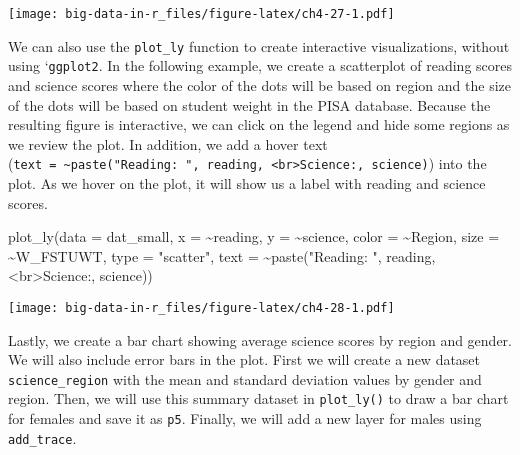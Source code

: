 \documentclass[
]{book}
\newenvironment{Shaded}{\begin{snugshade}}{\end{snugshade}}
\newcommand{\AttributeTok}[1]{\textcolor[rgb]{0.77,0.63,0.00}{#1}}
\newcommand{\FunctionTok}[1]{\textcolor[rgb]{0.00,0.00,0.00}{#1}}
\newcommand{\NormalTok}[1]{#1}
\newcommand{\SpecialCharTok}[1]{\textcolor[rgb]{0.00,0.00,0.00}{#1}}
\newcommand{\StringTok}[1]{\textcolor[rgb]{0.31,0.60,0.02}{#1}}
\begin{document}
\texttt{[image: big-data-in-r\_files/figure-latex/ch4-27-1.pdf]}

We can also use the \texttt{plot\_ly} function to create interactive visualizations, without using `\texttt{ggplot2}. In the following example, we create a scatterplot of reading scores and science scores where the color of the dots will be based on region and the size of the dots will be based on student weight in the PISA database. Because the resulting figure is interactive, we can click on the legend and hide some regions as we review the plot. In addition, we add a hover text (\texttt{text\ =\ \textasciitilde{}paste("Reading:\ ",\ reading,\ \textquotesingle{}\textless{}br\textgreater{}Science:\textquotesingle{},\ science)}) into the plot. As we hover on the plot, it will show us a label with reading and science scores.

\begin{Shaded}
\begin{Highlighting}[]
\FunctionTok{plot\_ly}\NormalTok{(}\AttributeTok{data =}\NormalTok{ dat\_small,}
        \AttributeTok{x =} \SpecialCharTok{\textasciitilde{}}\NormalTok{reading, }\AttributeTok{y =} \SpecialCharTok{\textasciitilde{}}\NormalTok{science, }\AttributeTok{color =} \SpecialCharTok{\textasciitilde{}}\NormalTok{Region,}
        \AttributeTok{size =} \SpecialCharTok{\textasciitilde{}}\NormalTok{W\_FSTUWT,}
        \AttributeTok{type =} \StringTok{"scatter"}\NormalTok{,}
        \AttributeTok{text =} \SpecialCharTok{\textasciitilde{}}\FunctionTok{paste}\NormalTok{(}\StringTok{"Reading: "}\NormalTok{, reading, }\StringTok{\textquotesingle{}\textless{}br\textgreater{}Science:\textquotesingle{}}\NormalTok{, science))}
\end{Highlighting}
\end{Shaded}

\texttt{[image: big-data-in-r\_files/figure-latex/ch4-28-1.pdf]}

Lastly, we create a bar chart showing average science scores by region and gender. We will also include error bars in the plot. First we will create a new dataset \texttt{science\_region} with the mean and standard deviation values by gender and region. Then, we will use this summary dataset in \texttt{plot\_ly()} to draw a bar chart for females and save it as \texttt{p5}. Finally, we will add a new layer for males using \texttt{add\_trace}.
\end{document}
